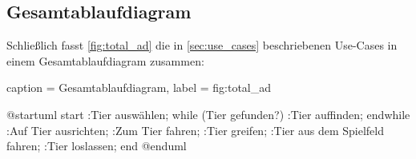 \subsection{Gesamtablaufdiagram}

Schließlich fasst \autoref{fig:total_ad} die in \autoref{sec:use_cases} beschriebenen Use-Cases in einem Gesamtablaufdiagram zusammen:

\begin{dhbwfigure}{%
    caption	= Gesamtablaufdiagram,
    label	= fig:total_ad
}

\begin{plantuml}
    @startuml
    start
    :Tier auswählen;
    while (Tier gefunden?)
        :Tier auffinden;
    endwhile
    :Auf Tier ausrichten;
    :Zum Tier fahren;
    :Tier greifen;
    :Tier aus dem Spielfeld fahren;
    :Tier loslassen;
    end
    @enduml
\end{plantuml}
    
\end{dhbwfigure}